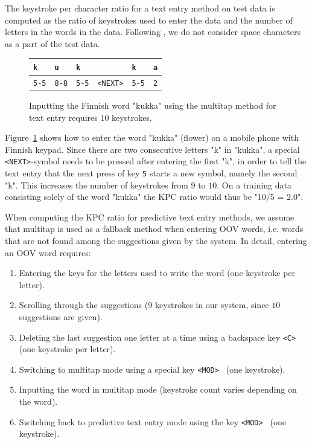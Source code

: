 \documentclass{llncs}
\begin{document}
The keystroke per character ratio for a text entry method on test data
is computed as the ratio of keystrokes used to enter the data and the
number of letters in the words in the data. Following
\cite{Tantug:2010}, we do not consider space characters as a part of
the test data.

\begin{figure}[htb!]
\begin{center}
\begin{tabular}{llllll}
\texttt{k} & \texttt{u} & \texttt{k} & & \texttt{k} & \texttt{a} \\ 
\hline
\texttt{5-5} & \texttt{8-8} & \texttt{5-5} & \texttt{<NEXT>} &
\texttt{5-5} & \texttt{2}
\end{tabular}
\caption{Inputting the Finnish word "kukka" using the multitap method
  for text entry requires $10$ keystrokes.}\label{kukka-kpc}
\end{center}
\end{figure}

Figure~\ref{kukka-kpc} shows how to enter the word "kukka" (flower) on
a mobile phone with Finnish keypad. Since there are two consecutive
letters "k" in "kukka", a special {\tt <NEXT>}-symbol needs to be
pressed after entering the first "k", in order to tell the text entry
that the next press of key {\tt 5} starts a new symbol, namely the
second "k". This increases the number of keystrokes from $9$ to
$10$. On a training data consisting solely of the word "kukka" the KPC
ratio would thus be "10/5 = 2.0".


When computing the KPC ratio for predictive text entry methods, we assume
that multitap is used as a fallback method when entering OOV words,
i.e. words that are not found among the suggestions given by the
system. In detail, entering an OOV word requires:
\begin{enumerate}
\item Entering the keys for the letters used to write the word (one keystroke per letter).
\item Scrolling through the suggestions ($9$ keystrokes in our system, since $10$ suggestions are given).
\item Deleting the last suggestion one letter at a time using a backspace key {\tt <C> } (one keystroke per letter).
\item Switching to multitap mode using a special key {\tt <MOD> } (one keystroke).
\item Inputting the word in multitap mode (keystroke count varies depending on the word).
\item Switching back to predictive text entry mode using the key {\tt <MOD> } (one keystroke).
\end{enumerate}
\end{document}
